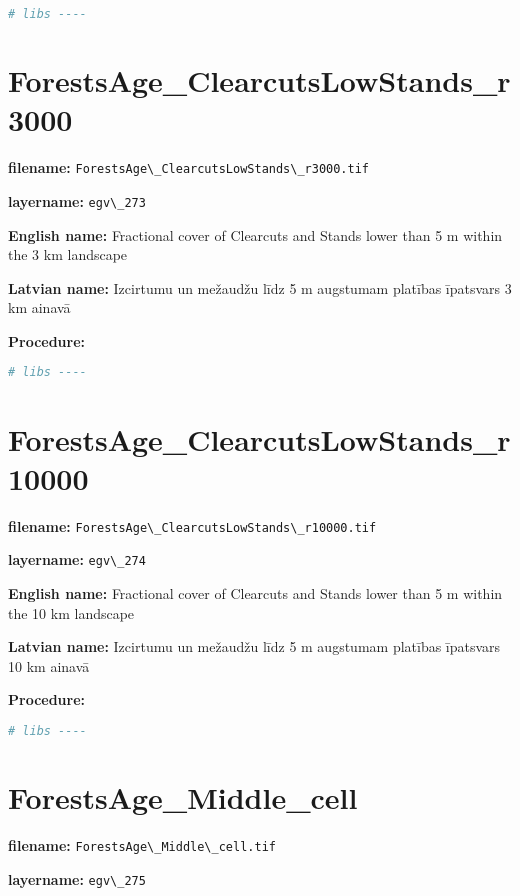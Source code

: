 \documentclass[
]{book}
\newcommand{\passthrough}[1]{#1}
\begin{document}
\begin{lstlisting}[language=R]
# libs ----
\end{lstlisting}

\section{ForestsAge\_ClearcutsLowStands\_r3000}\label{ch06.273}

\textbf{filename:} \passthrough{\lstinline!ForestsAge\_ClearcutsLowStands\_r3000.tif!}

\textbf{layername:} \passthrough{\lstinline!egv\_273!}

\textbf{English name:} Fractional cover of Clearcuts and Stands lower than 5 m within the 3 km landscape

\textbf{Latvian name:} Izcirtumu un mežaudžu līdz 5 m augstumam platības īpatsvars 3 km ainavā

\textbf{Procedure:}

\begin{lstlisting}[language=R]
# libs ----
\end{lstlisting}

\section{ForestsAge\_ClearcutsLowStands\_r10000}\label{ch06.274}

\textbf{filename:} \passthrough{\lstinline!ForestsAge\_ClearcutsLowStands\_r10000.tif!}

\textbf{layername:} \passthrough{\lstinline!egv\_274!}

\textbf{English name:} Fractional cover of Clearcuts and Stands lower than 5 m within the 10 km landscape

\textbf{Latvian name:} Izcirtumu un mežaudžu līdz 5 m augstumam platības īpatsvars 10 km ainavā

\textbf{Procedure:}

\begin{lstlisting}[language=R]
# libs ----
\end{lstlisting}

\section{ForestsAge\_Middle\_cell}\label{ch06.275}

\textbf{filename:} \passthrough{\lstinline!ForestsAge\_Middle\_cell.tif!}

\textbf{layername:} \passthrough{\lstinline!egv\_275!}
\end{document}
